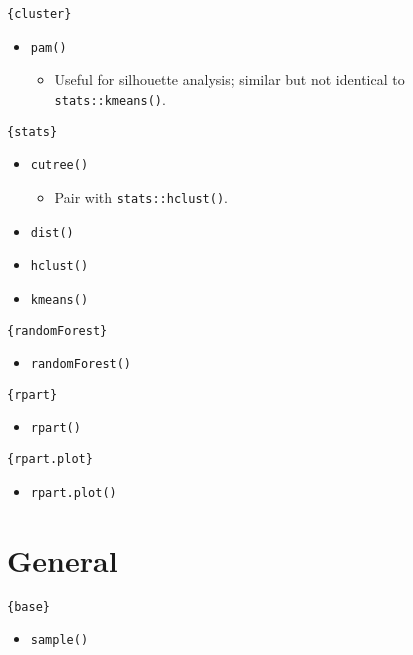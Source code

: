 \documentclass[
]{book}
\providecommand{\tightlist}{%
  \setlength{\itemsep}{0pt}\setlength{\parskip}{0pt}}
\begin{document}
\texttt{\{cluster\}}

\begin{itemize}
\tightlist
\item
  \texttt{pam()}

  \begin{itemize}
  \tightlist
  \item
    Useful for silhouette analysis; similar but not identical to \texttt{stats::kmeans()}.
  \end{itemize}
\end{itemize}

\texttt{\{stats\}}

\begin{itemize}
\tightlist
\item
  \texttt{cutree()}

  \begin{itemize}
  \tightlist
  \item
    Pair with \texttt{stats::hclust()}.
  \end{itemize}
\item
  \texttt{dist()}
\item
  \texttt{hclust()}
\item
  \texttt{kmeans()}
\end{itemize}

\texttt{\{randomForest\}}

\begin{itemize}
\tightlist
\item
  \texttt{randomForest()}
\end{itemize}

\texttt{\{rpart\}}

\begin{itemize}
\tightlist
\item
  \texttt{rpart()}
\end{itemize}

\texttt{\{rpart.plot\}}

\begin{itemize}
\tightlist
\item
  \texttt{rpart.plot()}
\end{itemize}

\hypertarget{general}{%
\section{General}\label{general}}

\texttt{\{base\}}

\begin{itemize}
\tightlist
\item
  \texttt{sample()}
\end{itemize}
\end{document}
